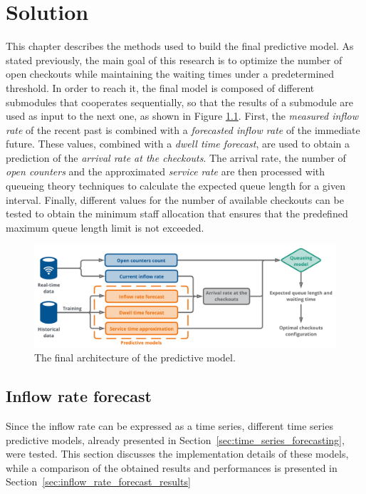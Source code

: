 \chapter{Solution}
\label{cha:solution}

This chapter describes the methods used to build the final predictive model. As stated previously, the main goal of this research is to optimize the number of open checkouts while maintaining the waiting times under a predetermined threshold. In order to reach it, the final model is composed of different submodules that cooperates sequentially, so that the results of a submodule are used as input to the next one, as shown in Figure \ref{fig:model_architecture}. First, the \emph{measured inflow rate} of the recent past is combined with a \emph{forecasted inflow rate} of the immediate future. These values, combined with a \emph{dwell time forecast}, are used to obtain a prediction of the \emph{arrival rate at the checkouts}. The arrival rate, the number of \emph{open counters} and the approximated \emph{service rate} are then processed with queueing theory techniques to calculate the expected queue length for a given interval. Finally, different values for the number of available checkouts can be tested to obtain the minimum staff allocation that ensures that the predefined maximum queue length limit is not exceeded.

\begin{figure}[H]
  \begin{center}
    \includegraphics[width=1\textwidth]{img/model_architecture.pdf}
  \end{center}
  \caption{The final architecture of the predictive model.}
  \label{fig:model_architecture}
\end{figure}

\section{Inflow rate forecast}
\label{sec:inflow_rate_forecast}

Since the inflow rate can be expressed as a time series, different time series predictive models, already presented in Section~\ref{sec:time_series_forecasting}, were tested. This section discusses the implementation details of these models, while a comparison of the obtained results and performances is presented in Section~\ref{sec:inflow_rate_forecast_results}

